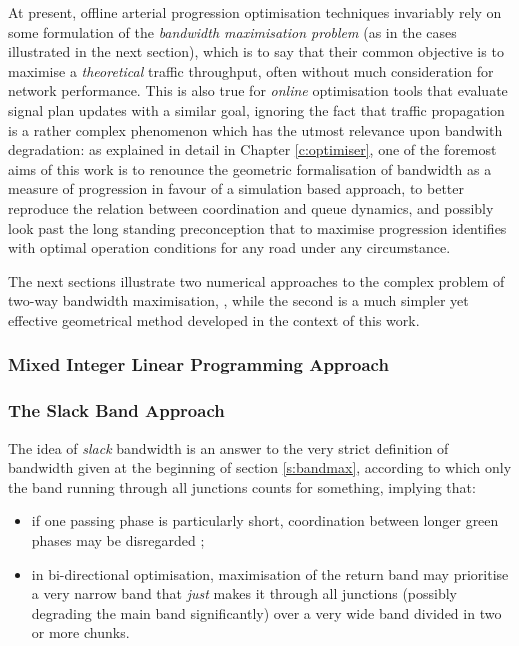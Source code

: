 At present, offline arterial progression optimisation techniques invariably rely on some formulation of the \emph{bandwidth maximisation problem} (as in the cases illustrated in the next section), which is to say that their common objective is to maximise a \emph{theoretical} traffic throughput, often without much consideration for network performance. This is also true for \emph{online} optimisation tools that evaluate signal plan updates with a similar goal, ignoring the fact that traffic propagation is a rather complex phenomenon which has the utmost relevance upon bandwith degradation: as explained in detail in Chapter \ref{c:optimiser}, one of the foremost aims of this work is to renounce the geometric formalisation of bandwidth as a measure of progression in favour of a simulation based approach, to better reproduce the relation between coordination and queue dynamics, and possibly look past the long standing preconception that to maximise progression identifies with optimal operation conditions for any road under any circumstance.

The next sections illustrate two numerical approaches to the complex problem of two-way bandwidth maximisation, , while the second is a much simpler yet effective geometrical method developed in the context of this work.

\subsubsection*{Mixed Integer Linear Programming Approach}

\subsubsection{The Slack Band Approach} \label{s:slackband}
The idea of \emph{slack} bandwidth is an answer to the very strict definition of bandwidth given at the beginning of section \ref{s:bandmax}, according to which only the band running through all junctions counts for something, implying that:
\begin{itemize}
\item if one passing phase is particularly short, coordination between longer green phases may be disregarded ;
\item in bi-directional optimisation, maximisation of the return band may prioritise a very narrow band that \emph{just} makes it through all junctions (possibly degrading the main band significantly) over a very wide band divided in two or more chunks.
\end{itemize} 
